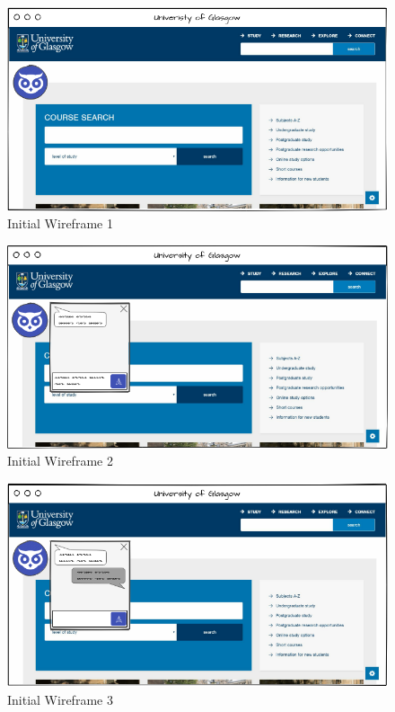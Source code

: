 \documentclass{l3proj}
\begin{document}
\begin{figure}[H]
    \centering
    \includegraphics[scale=0.7]{images/Chatbot_w1}
    \caption{Initial Wireframe 1}
    \label{fig:wireframe1}
\end{figure}

\begin{figure}[H]
    \centering
    \includegraphics[scale=0.7]{images/Chatbot_w3}
    \caption{Initial Wireframe 2}
    \label{fig:wireframe2}
\end{figure}

\begin{figure}[H]
    \centering
    \includegraphics[scale=0.7]{images/Chatbot_w2}
    \caption{Initial Wireframe 3}
    \label{fig:wirefram3}
\end{figure}
\end{document}
